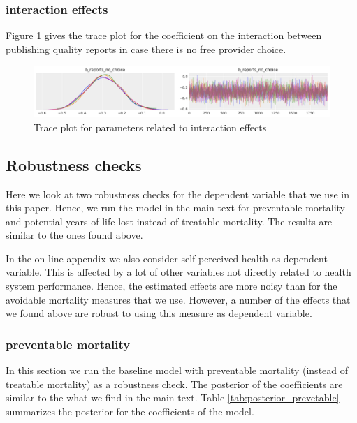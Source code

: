 \documentclass[a4paper,12pt]{article}
\begin{document}
\subsubsection{interaction effects}
\label{sec:orgd1e8940}

Figure \ref{fig:trace_interaction} gives the trace plot for the coefficient on the interaction between publishing quality reports in case there is no free provider choice.

\begin{figure}[htbp]
\centering
\includegraphics[width=.9\linewidth]{./figures/trace_interaction.png}
\caption{\label{fig:trace_interaction}Trace plot for parameters related to interaction effects}
\end{figure}



\subsection{Robustness checks}
\label{sec:org94221d8}
\label{app:robustness}

Here we look at two robustness checks for the dependent variable that we use in this paper. Hence, we run the model in the main text for preventable mortality and potential years of life lost instead of treatable mortality. The results are similar to the ones found above.

In the on-line appendix we also consider self-perceived health as dependent variable. This is affected by a lot of other variables not directly related to health system performance. Hence, the estimated effects are more noisy than for the avoidable mortality measures that we use. However, a number  of the effects that we found above are robust to using this measure as dependent variable.

\subsubsection{preventable mortality}
\label{sec:org68a37df}

In this section we run the baseline model with preventable mortality (instead of treatable mortality) as a robustness check. The posterior of the coefficients are similar to the what we find in the main text. Table \ref{tab:posterior_prevetable} summarizes the posterior for the coefficients of the model.
\end{document}
